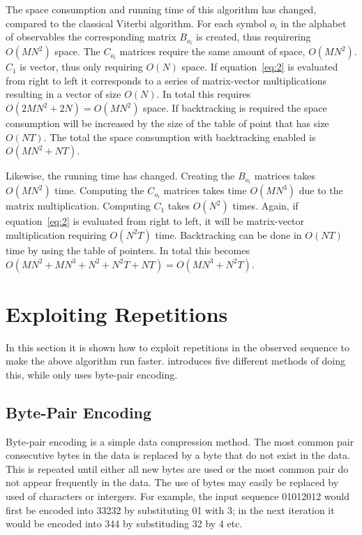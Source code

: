 The space consumption and running time of this algorithm has changed, compared
to the classical Viterbi algorithm. For each symbol $o_i$ in the alphabet of
observables the corresponding matrix $B_{o_i}$ is created, thus requirering
$O(M N^2)$ space. The $C_{o_i}$ matrices require the same amount of space,
$O(M N^2)$. $C_1$ is vector, thus only requiring $O(N)$ space. If
equation~\eqref{eq:2} is evaluated from right to left it corresponds to a
series of matrix-vector multiplications resulting in a vector of size
$O(N)$. In total this requires $O(2 M N^2 + 2 N) = O(M N^2)$ space. If
backtracking is required the space consumption will be increased by the size of
the table of point that has size $O(N T)$. The total the space consumption with
backtracking enabled is $O(M N^2 + N T)$.

Likewise, the running time has changed. Creating the $B_{o_i}$ matrices takes
$O(M N^2)$ time. Computing the $C_{o_i}$ matrices takes time $O(M N^3)$ due to
the matrix multiplication. Computing $C_1$ takes $O(N^2)$ times. Again, if
equation~\eqref{eq:2} is evaluated from right to left, it will be matrix-vector
multiplication requiring $O(N^2 T)$ time. Backtracking can be done in $O(NT)$
time by using the table of pointers. In total this becomes $O(M N^2 + M N^3 +
N^2 + N^2 T + NT) = O(M N^3 + N^2 T)$.

\section{Exploiting Repetitions}
\label{sec:expl-repet}

In this section it is shown how to exploit repetitions in the observed sequence
to make the above algorithm run faster. \citet{lifshits2009speeding} introduces
five different methods of doing this, while \citet{sand2013ziphmmlib} only uses
byte-pair encoding.

\subsection{Byte-Pair Encoding}
\label{sec:byte-pair-encoding}

Byte-pair encoding is a simple data compression method. The most common pair
consecutive bytes in the data is replaced by a byte that do not exist in the
data. This is repeated until either all new bytes are used or the most common
pair do not appear frequently in the data. The use of bytes may easily be
replaced by used of characters or intergers. For example, the input sequence
01012012 would first be encoded into 33232 by substituting 01 with 3; in the
next iteration it would be encoded into 344 by substituding 32 by 4 etc.

